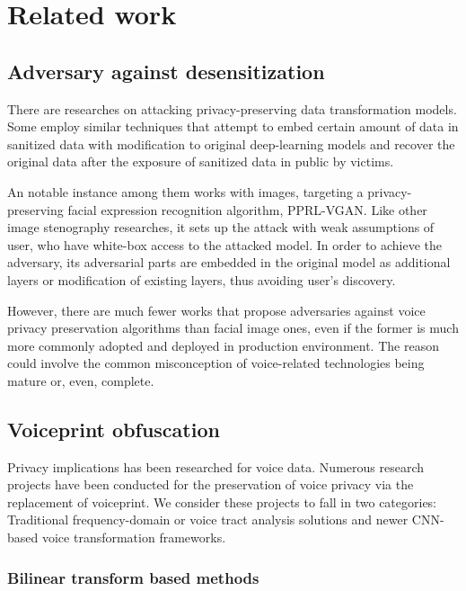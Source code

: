 \documentclass[journal]{IEEEtran} %
\begin{document}
\section{Related work}
\label{seg:related}

\subsection{Adversary against desensitization}

There are researches on attacking privacy-preserving data transformation models. Some employ similar techniques that attempt to embed certain amount of data in sanitized data with modification to original deep-learning models and recover the original data after the exposure of sanitized data in public by victims.

An notable instance among them works with images, targeting a privacy-preserving facial expression recognition algorithm, PPRL-VGAN. Like other image stenography researches\cite{imgsteno}, it sets up the attack with weak assumptions of user, who have white-box access to the attacked model. In order to achieve the adversary, its adversarial parts are embedded in the original model as additional layers or modification of existing layers, thus avoiding user's discovery.\cite{pprl-vgan,subvert}

However, there are much fewer works that propose adversaries against voice privacy preservation algorithms than facial image ones, even if the former is much more commonly adopted and deployed in production environment. The reason could involve the common misconception of voice-related technologies being mature or, even, complete.

\subsection{Voiceprint obfuscation}

Privacy implications has been researched for voice data\cite{priv_spk_char, priv_impl_vaa}. Numerous research projects have been conducted for the preservation of voice privacy via the replacement of voiceprint. We consider these projects to fall in two categories: Traditional frequency-domain or voice tract analysis solutions and newer CNN-based voice transformation frameworks.

\subsubsection{Bilinear transform based methods}
\end{document}
